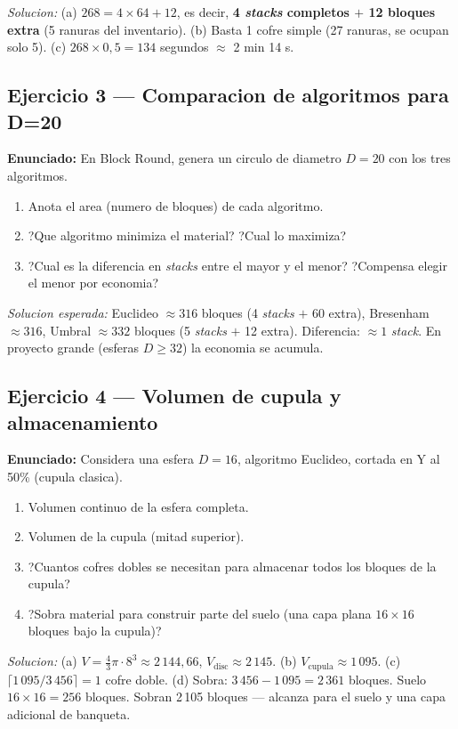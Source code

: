 \documentclass[12pt,a4paper]{scrartcl}
\newcommand{\acc}[1]{\textcolor{accent}{\textbf{#1}}}
\begin{document}
\emph{Solucion:} (a) $268 = 4 \times 64 + 12$, es decir, \acc{4 \emph{stacks} completos $+$ 12 bloques extra} (5 ranuras del inventario). (b) Basta 1 cofre simple (27 ranuras, se ocupan solo 5). (c) $268 \times 0{,}5 = 134$ segundos $\approx$ 2 min 14 s.

\subsection*{Ejercicio 3 --- Comparacion de algoritmos para D=20}
\textbf{Enunciado:} En Block Round, genera un circulo de diametro $D = 20$ con los tres algoritmos.
\begin{enumerate}[label=\alph*),leftmargin=1.5em,itemsep=0.1em,topsep=0.2em,nosep]
  \item Anota el area (numero de bloques) de cada algoritmo.
  \item ?Que algoritmo minimiza el material? ?Cual lo maximiza?
  \item ?Cual es la diferencia en \emph{stacks} entre el mayor y el menor? ?Compensa elegir el menor por economia?
\end{enumerate}

\emph{Solucion esperada:} Euclideo $\approx 316$ bloques (4 \emph{stacks} $+$ 60 extra), Bresenham $\approx 316$, Umbral $\approx 332$ bloques (5 \emph{stacks} $+$ 12 extra). Diferencia: $\approx 1$ \emph{stack}. En proyecto grande (esferas $D \geq 32$) la economia se acumula.

\subsection*{Ejercicio 4 --- Volumen de cupula y almacenamiento}
\textbf{Enunciado:} Considera una esfera $D = 16$, algoritmo Euclideo, cortada en Y al 50\% (cupula clasica).
\begin{enumerate}[label=\alph*),leftmargin=1.5em,itemsep=0.1em,topsep=0.2em,nosep]
  \item Volumen continuo de la esfera completa.
  \item Volumen de la cupula (mitad superior).
  \item ?Cuantos cofres dobles se necesitan para almacenar todos los bloques de la cupula?
  \item ?Sobra material para construir parte del suelo (una capa plana $16 \times 16$ bloques bajo la cupula)?
\end{enumerate}

\emph{Solucion:}
(a) $V = \tfrac{4}{3}\pi \cdot 8^3 \approx 2\,144{,}66$, $V_{\mathrm{disc}} \approx 2\,145$. (b) $V_{\mathrm{cupula}} \approx 1\,095$. (c) $\lceil 1\,095 / 3\,456 \rceil = 1$ cofre doble. (d) Sobra: $3\,456 - 1\,095 = 2\,361$ bloques. Suelo $16 \times 16 = 256$ bloques. Sobran 2\,105 bloques --- alcanza para el suelo y una capa adicional de banqueta.
\end{document}
